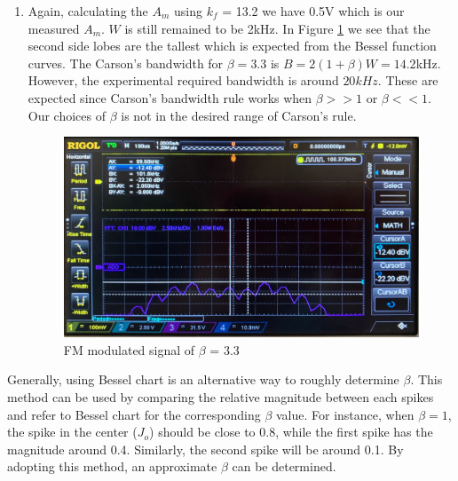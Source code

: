 \documentclass[11pt]{article}
\begin{document}
\begin{enumerate}[label=(\alph*)]
\begin{enumerate}
    \item
    Again, calculating the $A_m$ using $k_f$ = 13.2 we have 0.5V which is our measured $A_m$. $W$ is still remained to be 2kHz. In Figure \ref{fig:W3Q4bB2_4} we see that the second side lobes are the tallest which is expected from the Bessel function curves. 
    The Carson's bandwidth for $\beta = 3.3$ is $B = 2(1 + \beta)W = 14.2$kHz. However, the experimental required bandwidth is around $20kHz$. These are expected since Carson's bandwidth rule works when $\beta>>1$ or $\beta<<1$. Our choices of $\beta$ is not in the desired range of Carson's rule.
    \begin{figure}[H]
    \centering
    \includegraphics[width=15cm]{W3Q4bB2_4.jpg}
    \caption{FM modulated signal of $\beta$ = 3.3}
    \label{fig:W3Q4bB2_4}
    \end{figure}
\end{enumerate}
Generally, using Bessel chart is an alternative way to roughly determine $\beta$. This method can be used by comparing the relative magnitude between each spikes and refer to Bessel chart for the corresponding $\beta$ value. For instance, when $\beta=1$, the spike in the center ($J_o$) should be close to 0.8, while the first spike has the magnitude around 0.4. Similarly, the second spike will be around 0.1. By adopting this method, an approximate $\beta$ can be determined.
\end{enumerate}

\newpage
\end{document}
